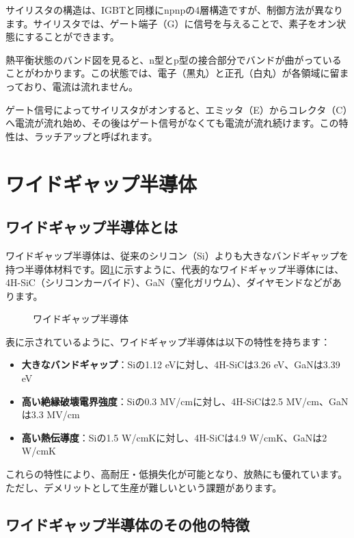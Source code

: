 サイリスタの構造は、IGBTと同様にnpnpの4層構造ですが、制御方法が異なります。サイリスタでは、ゲート端子（G）に信号を与えることで、素子をオン状態にすることができます。

熱平衡状態のバンド図を見ると、n型とp型の接合部分でバンドが曲がっていることがわかります。この状態では、電子（黒丸）と正孔（白丸）が各領域に留まっており、電流は流れません。

ゲート信号によってサイリスタがオンすると、エミッタ（E）からコレクタ（C）へ電流が流れ始め、その後はゲート信号がなくても電流が流れ続けます。この特性は、ラッチアップと呼ばれます。

\section{ワイドギャップ半導体}

\subsection{ワイドギャップ半導体とは}

ワイドギャップ半導体は、従来のシリコン（Si）よりも大きなバンドギャップを持つ半導体材料です。図\ref{fig:widegap}に示すように、代表的なワイドギャップ半導体には、4H-SiC（シリコンカーバイド）、GaN（窒化ガリウム）、ダイヤモンドなどがあります。

\begin{figure}[H]
\centering
{}
\caption{ワイドギャップ半導体}
\label{fig:widegap}
\end{figure}

表に示されているように、ワイドギャップ半導体は以下の特性を持ちます：

\begin{itemize}
\item \textbf{大きなバンドギャップ}：Siの1.12 eVに対し、4H-SiCは3.26 eV、GaNは3.39 eV
\item \textbf{高い絶縁破壊電界強度}：Siの0.3 MV/cmに対し、4H-SiCは2.5 MV/cm、GaNは3.3 MV/cm
\item \textbf{高い熱伝導度}：Siの1.5 W/cmKに対し、4H-SiCは4.9 W/cmK、GaNは2 W/cmK
\end{itemize}

これらの特性により、高耐圧・低損失化が可能となり、放熱にも優れています。ただし、デメリットとして生産が難しいという課題があります。

\subsection{ワイドギャップ半導体のその他の特徴}

